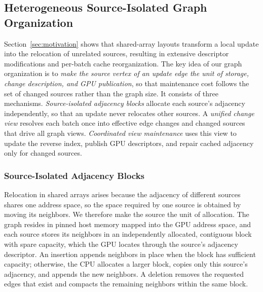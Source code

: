 \subsection{Heterogeneous Source-Isolated Graph Organization}
\label{sec:graph-organization}

Section~\ref{sec:motivation} shows that shared-array layouts transform a local update into the relocation of unrelated sources, resulting in extensive descriptor modifications and per-batch cache reorganization. The key idea of our graph organization is to \textit{make the source vertex of an update edge the unit of storage, change description, and GPU publication}, so that maintenance cost follows the set of changed sources rather than the graph size. It consists of three mechanisms. \textit{Source-isolated adjacency blocks} allocate each source's adjacency independently, so that an update never relocates other sources. A \textit{unified change view} resolves each batch once into effective edge changes and changed sources that drive all graph views. \textit{Coordinated view maintenance} uses this view to update the reverse index, publish GPU descriptors, and repair cached adjacency only for changed sources.


\subsubsection{Source-Isolated Adjacency Blocks}
\label{sec:source-layout}
Relocation in shared arrays arises because the adjacency of different sources shares one address space, so the space required by one source is obtained by moving its neighbors. We therefore make the source the unit of allocation. The graph resides in pinned host memory mapped into the GPU address space, and each source stores its neighbors in an independently allocated, contiguous block with spare capacity, which the GPU locates through the source's adjacency descriptor. An insertion appends neighbors in place when the block has sufficient capacity; otherwise, the CPU allocates a larger block, copies only this source's adjacency, and appends the new neighbors. A deletion removes the requested edges that exist and compacts the remaining neighbors within the same block.

